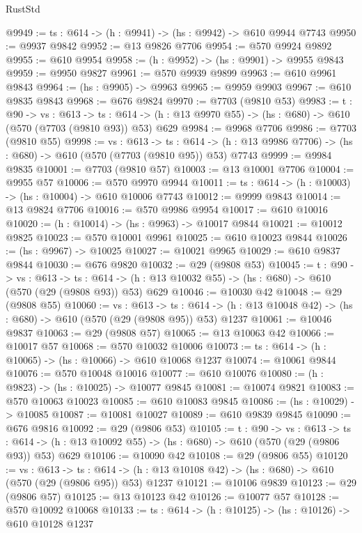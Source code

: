 \begin{lexlean}{RustStd}
\begin{coremodule}
@9949 := {ts : @614} -> (h : @9941) -> (hs : @9942) -> @610 @9944 @7743
@9950 := @9937 @9842
@9952 := @13 @9826 @7706
@9954 := @570 @9924 @9892
@9955 := @610 @9954
@9958 := (h : @9952) -> (hs : @9901) -> @9955 @9843
@9959 := @9950 @9827
@9961 := @570 @9939 @9899
@9963 := @610 @9961 @9843
@9964 := (hs : @9905) -> @9963
@9965 := @9959 @9903
@9967 := @610 @9835 @9843
@9968 := @676 @9824
@9970 := @7703 (@9810 @53)
@9983 := {t : @90} ->
  {vs : @613} ->
  {ts : @614} -> (h : @13 @9970 @55) -> (hs : @680) -> @610 (@570 (@7703 (@9810 @93)) @53) @629
@9984 := @9968 @7706
@9986 := @7703 (@9810 @55)
@9998 := {vs : @613} ->
  {ts : @614} -> (h : @13 @9986 @7706) -> (hs : @680) -> @610 (@570 (@7703 (@9810 @95)) @53) @7743
@9999 := @9984 @9835
@10001 := @7703 (@9810 @57)
@10003 := @13 @10001 @7706
@10004 := @9955 @57
@10006 := @570 @9970 @9944
@10011 := {ts : @614} -> (h : @10003) -> (hs : @10004) -> @610 @10006 @7743
@10012 := @9999 @9843
@10014 := @13 @9824 @7706
@10016 := @570 @9986 @9954
@10017 := @610 @10016
@10020 := (h : @10014) -> (hs : @9963) -> @10017 @9844
@10021 := @10012 @9825
@10023 := @570 @10001 @9961
@10025 := @610 @10023 @9844
@10026 := (hs : @9967) -> @10025
@10027 := @10021 @9965
@10029 := @610 @9837 @9844
@10030 := @676 @9820
@10032 := @29 (@9808 @53)
@10045 := {t : @90} ->
  {vs : @613} ->
  {ts : @614} -> (h : @13 @10032 @55) -> (hs : @680) -> @610 (@570 (@29 (@9808 @93)) @53) @629
@10046 := @10030 @42
@10048 := @29 (@9808 @55)
@10060 := {vs : @613} ->
  {ts : @614} -> (h : @13 @10048 @42) -> (hs : @680) -> @610 (@570 (@29 (@9808 @95)) @53) @1237
@10061 := @10046 @9837
@10063 := @29 (@9808 @57)
@10065 := @13 @10063 @42
@10066 := @10017 @57
@10068 := @570 @10032 @10006
@10073 := {ts : @614} -> (h : @10065) -> (hs : @10066) -> @610 @10068 @1237
@10074 := @10061 @9844
@10076 := @570 @10048 @10016
@10077 := @610 @10076
@10080 := (h : @9823) -> (hs : @10025) -> @10077 @9845
@10081 := @10074 @9821
@10083 := @570 @10063 @10023
@10085 := @610 @10083 @9845
@10086 := (hs : @10029) -> @10085
@10087 := @10081 @10027
@10089 := @610 @9839 @9845
@10090 := @676 @9816
@10092 := @29 (@9806 @53)
@10105 := {t : @90} ->
  {vs : @613} ->
  {ts : @614} -> (h : @13 @10092 @55) -> (hs : @680) -> @610 (@570 (@29 (@9806 @93)) @53) @629
@10106 := @10090 @42
@10108 := @29 (@9806 @55)
@10120 := {vs : @613} ->
  {ts : @614} -> (h : @13 @10108 @42) -> (hs : @680) -> @610 (@570 (@29 (@9806 @95)) @53) @1237
@10121 := @10106 @9839
@10123 := @29 (@9806 @57)
@10125 := @13 @10123 @42
@10126 := @10077 @57
@10128 := @570 @10092 @10068
@10133 := {ts : @614} -> (h : @10125) -> (hs : @10126) -> @610 @10128 @1237

\end{coremodule}
\end{lexlean}
